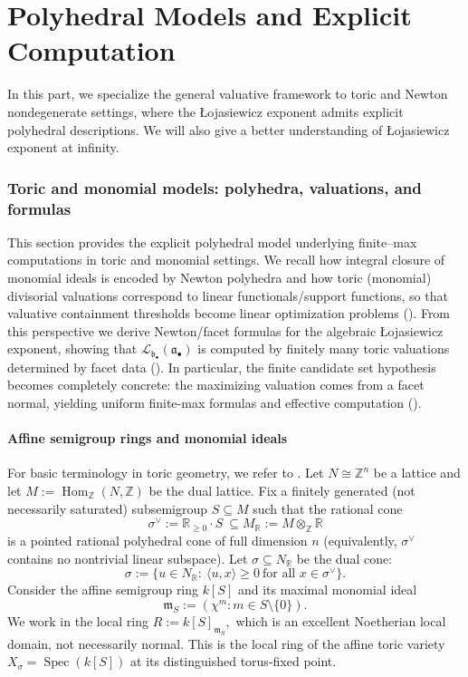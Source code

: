 \documentclass[12pt]{amsart}
\newcommand{\kk}{k}
\newcommand{\ZZ}{\mathbb{Z}}
\newcommand{\RR}{\mathbb{R}}
\newcommand{\m}{\mathfrak m}
\renewcommand{\a}{\mathfrak{a}}
\renewcommand{\b}{\mathfrak{b}}
\newcommand{\Loj}{\mathcal{L}} %
\newcommand{\ip}[2]{{\langle #1,#2\rangle}}
\DeclareMathOperator{\Hom}{Hom}
\DeclareMathOperator{\Spec}{Spec}
\newcommand{\abul}{{\a_\bullet}}
\newcommand{\bbul}{{\b_\bullet}}
\theoremstyle{plain}
\theoremstyle{definition}
\numberwithin{equation}{section}
\begin{document}
\part{Polyhedral Models and Explicit Computation} \label{part:polyhedral}

In this part, we specialize the general valuative framework to toric and
Newton nondegenerate settings, where the \L{}ojasiewicz exponent admits explicit polyhedral
descriptions. We will also give a better understanding of \L{}ojasiewicz exponent at infinity.


\section{Toric and monomial models: polyhedra, valuations, and formulas}\label{sec:toric}

This section provides the explicit polyhedral model underlying finite--max computations in toric and monomial settings.  We recall how integral closure of monomial ideals is encoded by Newton polyhedra and how toric (monomial) divisorial valuations correspond to linear functionals/support functions, so that valuative containment thresholds become linear optimization problems ().  From this perspective we derive Newton/facet formulas for the algebraic \L{}ojasiewicz exponent, showing that $\Loj_{\bbul}(\abul)$ is computed by finitely many toric valuations determined by facet data ().  In particular, the finite candidate set hypothesis becomes completely concrete: the maximizing valuation comes from a facet normal, yielding uniform finite-max formulas and effective computation ().

\subsection{Affine semigroup rings and monomial ideals}

For basic terminology in toric geometry, we refer to \cite{CLS,Fulton}. Let $N\cong \ZZ^n$ be a lattice and let $M:=\Hom_\ZZ(N,\ZZ)$ be the dual lattice.
Fix a finitely generated (not necessarily saturated) subsemigroup
$S\subseteq M$
such that the rational cone
\[
\sigma^\vee:=\RR_{\ge 0}\cdot S \ \subseteq  M_\RR:=M\otimes_\ZZ \RR
\]
is a pointed rational polyhedral cone of full dimension $n$ (equivalently, $\sigma^\vee$
contains no nontrivial linear subspace). Let $\sigma\subseteq N_\RR$ be the dual cone:
\[
\sigma:=\{u\in N_\RR:\ \ip{u}{x}\ge 0\ \text{for all }x\in\sigma^\vee\}.
\]
Consider the affine semigroup ring $\kk[S]$ and its maximal monomial ideal
\[
\m_S := ( \chi^m : m\in S\setminus\{0\} ).
\]
We work in the local ring
$R := \kk[S]_{\m_S},$ which is an excellent Noetherian local domain, not necessarily normal.
This is the local ring of the affine toric variety $X_\sigma=\Spec(\kk[S])$ at its
distinguished torus-fixed point.
\end{document}
